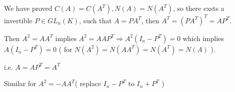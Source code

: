 \documentclass{article}
\begin{document}
We have proved  $ C(A)=C(A^T),N(A)=N(A^T) $, so there exsts a invertible  $ P \in GL_n(K)$, such that  $ A=PA^T $,
then  $ A^T=(PA^T)^T=AP^T $.

Then  $ A^2=AA^T $ implies  $ A^2=AAP^T\Rightarrow A^2(I_n-P^T)=0 $ which implies $ A(I_n-P^T)=0 $ ( for  $  N(A^2)=N(AA^T)=N(A^T)=N(A) $ ).

i.e. $ A=AP^T=A^T $ 

Similar for $ A^2=-AA^T $( replace  $ I_n-P^T $ to  $ I_n+P^T $  ) 
\end{document}
